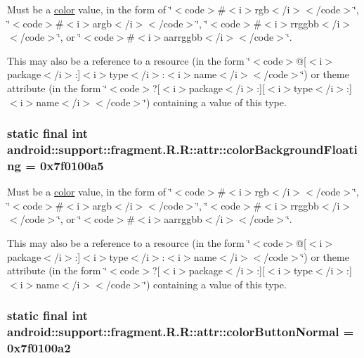 Must be a \hyperlink{classandroid_1_1support_1_1fragment_1_1_r_1_1color}{color} value, in the form of \char`\"{}$<$code$>$\#$<$i$>$rgb$<$/i$>$$<$/code$>$\char`\"{}, \char`\"{}$<$code$>$\#$<$i$>$argb$<$/i$>$$<$/code$>$\char`\"{}, \char`\"{}$<$code$>$\#$<$i$>$rrggbb$<$/i$>$$<$/code$>$\char`\"{}, or \char`\"{}$<$code$>$\#$<$i$>$aarrggbb$<$/i$>$$<$/code$>$\char`\"{}. 

This may also be a reference to a resource (in the form \char`\"{}$<$code$>$@\mbox{[}$<$i$>$package$<$/i$>$:\mbox{]}$<$i$>$type$<$/i$>$:$<$i$>$name$<$/i$>$$<$/code$>$\char`\"{}) or theme attribute (in the form \char`\"{}$<$code$>$?\mbox{[}$<$i$>$package$<$/i$>$:\mbox{]}\mbox{[}$<$i$>$type$<$/i$>$:\mbox{]}$<$i$>$name$<$/i$>$$<$/code$>$\char`\"{}) containing a value of this type. \hypertarget{classandroid_1_1support_1_1fragment_1_1_r_1_1attr_5e8d2f2b1995029d2b886848e351c915}{
\subsubsection[{colorBackgroundFloating}]{\setlength{\rightskip}{0pt plus 5cm}static final int android::support::fragment.R.R::attr::colorBackgroundFloating = 0x7f0100a5}}
\label{classandroid_1_1support_1_1fragment_1_1_r_1_1attr_5e8d2f2b1995029d2b886848e351c915}


Must be a \hyperlink{classandroid_1_1support_1_1fragment_1_1_r_1_1color}{color} value, in the form of \char`\"{}$<$code$>$\#$<$i$>$rgb$<$/i$>$$<$/code$>$\char`\"{}, \char`\"{}$<$code$>$\#$<$i$>$argb$<$/i$>$$<$/code$>$\char`\"{}, \char`\"{}$<$code$>$\#$<$i$>$rrggbb$<$/i$>$$<$/code$>$\char`\"{}, or \char`\"{}$<$code$>$\#$<$i$>$aarrggbb$<$/i$>$$<$/code$>$\char`\"{}. 

This may also be a reference to a resource (in the form \char`\"{}$<$code$>$@\mbox{[}$<$i$>$package$<$/i$>$:\mbox{]}$<$i$>$type$<$/i$>$:$<$i$>$name$<$/i$>$$<$/code$>$\char`\"{}) or theme attribute (in the form \char`\"{}$<$code$>$?\mbox{[}$<$i$>$package$<$/i$>$:\mbox{]}\mbox{[}$<$i$>$type$<$/i$>$:\mbox{]}$<$i$>$name$<$/i$>$$<$/code$>$\char`\"{}) containing a value of this type. \hypertarget{classandroid_1_1support_1_1fragment_1_1_r_1_1attr_fff236963590fbb943a0229f9e9f32d8}{
\subsubsection[{colorButtonNormal}]{\setlength{\rightskip}{0pt plus 5cm}static final int android::support::fragment.R.R::attr::colorButtonNormal = 0x7f0100a2}}
\label{classandroid_1_1support_1_1fragment_1_1_r_1_1attr_fff236963590fbb943a0229f9e9f32d8}



